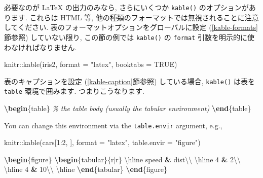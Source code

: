 \documentclass[
  11pt,
]{bxjsreport}
\newenvironment{Shaded}{\begin{snugshade}}{\end{snugshade}}
\newcommand{\AttributeTok}[1]{\textcolor[rgb]{0.77,0.63,0.00}{#1}}
\newcommand{\CommentTok}[1]{\textcolor[rgb]{0.56,0.35,0.01}{\textit{#1}}}
\newcommand{\ConstantTok}[1]{\textcolor[rgb]{0.00,0.00,0.00}{#1}}
\newcommand{\DecValTok}[1]{\textcolor[rgb]{0.00,0.00,0.81}{#1}}
\newcommand{\ExtensionTok}[1]{#1}
\newcommand{\FunctionTok}[1]{\textcolor[rgb]{0.00,0.00,0.00}{#1}}
\newcommand{\KeywordTok}[1]{\textcolor[rgb]{0.13,0.29,0.53}{\textbf{#1}}}
\newcommand{\NormalTok}[1]{#1}
\newcommand{\OperatorTok}[1]{\textcolor[rgb]{0.81,0.36,0.00}{\textbf{#1}}}
\newcommand{\SpecialCharTok}[1]{\textcolor[rgb]{0.00,0.00,0.00}{#1}}
\newcommand{\StringTok}[1]{\textcolor[rgb]{0.31,0.60,0.02}{#1}}
\begin{document}
必要なのが LaTeX の出力のみなら, さらにいくつか \texttt{kable()} のオプションがあります. これらは HTML 等, 他の種類のフォーマットでは無視されることに注意してください. 表のフォーマットオプションをグローバルに設定 (\ref{kable-formats}節参照) していない限り, この節の例では \texttt{kable()} の \texttt{format} 引数を明示的に使わなければなりません.

\begin{Shaded}
\begin{Highlighting}[numbers=left,,]
\NormalTok{knitr}\SpecialCharTok{::}\FunctionTok{kable}\NormalTok{(iris2, }\AttributeTok{format =} \StringTok{"latex"}\NormalTok{, }\AttributeTok{booktabs =} \ConstantTok{TRUE}\NormalTok{)}
\end{Highlighting}
\end{Shaded}

表のキャプションを設定 (\ref{kable-caption}節参照) している場合, \texttt{kable()} は表を \texttt{table} 環境で囲みます. つまりこうなります.

\begin{Shaded}
\begin{Highlighting}[]
\KeywordTok{\textbackslash{}begin}\NormalTok{\{}\ExtensionTok{table}\NormalTok{\}}
\CommentTok{\% the table body (usually the tabular environment)}
\KeywordTok{\textbackslash{}end}\NormalTok{\{}\ExtensionTok{table}\NormalTok{\}}
\end{Highlighting}
\end{Shaded}

You can change this environment via the \texttt{table.envir} argument, e.g.,

\begin{Shaded}
\begin{Highlighting}[numbers=left,,]
\NormalTok{knitr}\SpecialCharTok{::}\FunctionTok{kable}\NormalTok{(cars[}\DecValTok{1}\SpecialCharTok{:}\DecValTok{2}\NormalTok{, ], }\AttributeTok{format =} \StringTok{"latex"}\NormalTok{, }\AttributeTok{table.envir =} \StringTok{"figure"}\NormalTok{)}
\end{Highlighting}
\end{Shaded}

\begin{Shaded}
\begin{Highlighting}[]
\KeywordTok{\textbackslash{}begin}\NormalTok{\{}\ExtensionTok{figure}\NormalTok{\}}
\KeywordTok{\textbackslash{}begin}\NormalTok{\{}\ExtensionTok{tabular}\NormalTok{\}\{r|r\}}
\FunctionTok{\textbackslash{}hline}
\NormalTok{speed }\OperatorTok{\&}\NormalTok{ dist}\FunctionTok{\textbackslash{}\textbackslash{}}
\FunctionTok{\textbackslash{}hline}
\NormalTok{4 }\OperatorTok{\&}\NormalTok{ 2}\FunctionTok{\textbackslash{}\textbackslash{}}
\FunctionTok{\textbackslash{}hline}
\NormalTok{4 }\OperatorTok{\&}\NormalTok{ 10}\FunctionTok{\textbackslash{}\textbackslash{}}
\FunctionTok{\textbackslash{}hline}
\KeywordTok{\textbackslash{}end}\NormalTok{\{}\ExtensionTok{tabular}\NormalTok{\}}
\KeywordTok{\textbackslash{}end}\NormalTok{\{}\ExtensionTok{figure}\NormalTok{\}}
\end{Highlighting}
\end{Shaded}
\end{document}
